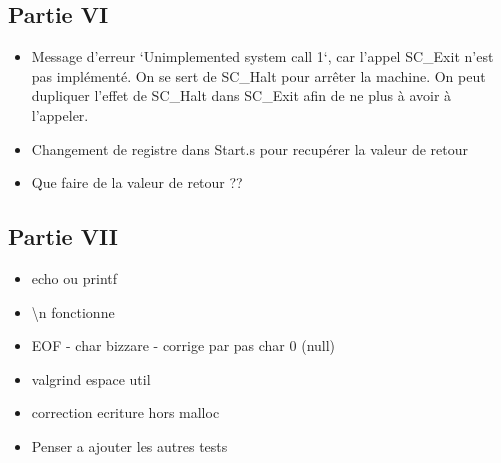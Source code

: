 \documentclass{article}
\begin{document}
\subsection{Partie VI}
\begin{itemize}
    \item Message d'erreur `Unimplemented system call 1`, car l'appel SC\_Exit n'est pas
          implémenté. On se sert de SC\_Halt pour arrêter la machine. On peut dupliquer
          l'effet de SC\_Halt dans SC\_Exit afin de ne plus à avoir à l'appeler.
    \item Changement de registre dans Start.s pour recupérer la valeur de retour
    \item Que faire de la valeur de retour ??
\end{itemize}

\subsection{Partie VII}
\begin{itemize}
    \item echo ou printf
    \item \textbackslash n fonctionne
    \item EOF - char bizzare - corrige par pas char 0 (null)
    \item valgrind espace util
    \item correction ecriture hors malloc
    \item Penser a ajouter les autres tests
\end{itemize}
\end{document}
